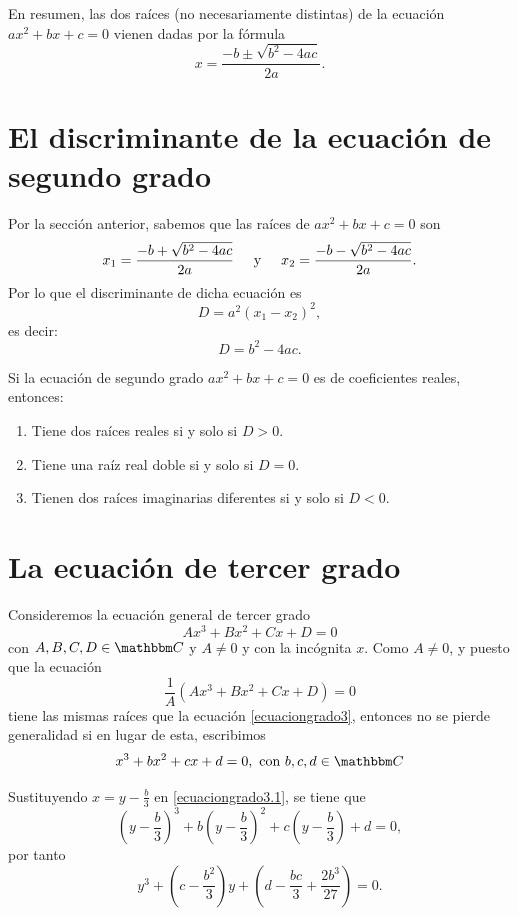 En resumen, las dos raíces (no necesariamente distintas) de la ecuación $ax^2+bx+c=0$ vienen dadas por la fórmula
$$x=\frac{-b \pm \sqrt{b^2-4ac}}{2a}.$$

\section{El discriminante de la ecuación de segundo grado}

Por la sección anterior, sabemos que las raíces de $ax^2+bx+c=0$ son
$$x_1=\frac{-b + \sqrt{b^2-4ac}}{2a} \hspace{0.5cm} \text{y} \hspace{0.5cm} x_2=\frac{-b - \sqrt{b^2-4ac}}{2a}.$$
Por lo que el discriminante de dicha ecuación es
$$D=a^2(x_1-x_2)^2,$$
es decir:
$$D=b^2-4ac.$$

\begin{observation}
    Si la ecuación de segundo grado $ax^2+bx+c=0$ es de coeficientes reales, entonces:
    \begin{enumerate}[label=\roman*.]
        \item Tiene dos raíces reales si y solo si $D>0$.
        \item Tiene una raíz real doble si y solo si $D=0$.
        \item Tienen dos raíces imaginarias diferentes si y solo si $D<0$.
    \end{enumerate}
\end{observation}

\section{La ecuación de tercer grado} \label{sec:B4}

Consideremos la ecuación general de tercer grado
\begin{equation}
    Ax^3+Bx^2+Cx+D=0 \label{ecuaciongrado3}
\end{equation}
con $A,  B,  C,  D \in \CC$ y $A \neq 0$ y con la incógnita $x$. Como $A \neq 0$, y puesto que la ecuación
$$\frac{1}{A} \left( Ax^3+Bx^2+Cx+D \right) =0$$
tiene las mismas raíces que la ecuación \eqref{ecuaciongrado3}, entonces no se pierde generalidad si en lugar de esta, escribimos
\begin{equation}
    x^3+bx^2+cx+d=0, \text{ con }  b,  c,  d \in \CC \label{ecuaciongrado3.1}
\end{equation}

Sustituyendo $\displaystyle x=y-\frac{b}{3}$ en \eqref{ecuaciongrado3.1}, se tiene que
$$\left( y-\frac{b}{3} \right)^3+b \left( y-\frac{b}{3} \right)^2+c \left( y-\frac{b}{3} \right) +d=0,$$
por tanto
$$y^3+\left( c-\frac{b^2}{3} \right) y + \left( d-\frac{bc}{3}+\frac{2b^3}{27} \right) =0.$$\newpage

